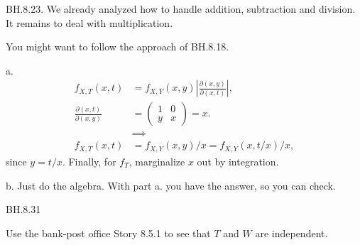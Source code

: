 \begin{exercise}
BH.8.23. We already analyzed how to handle addition, subtraction and division. It remains to deal with multiplication.
\begin{hint}
You might want to follow the approach of BH.8.18.
\end{hint}
\begin{solution}
a.
\begin{align*}
f_{X,T}(x,t) &= f_{X,Y}(x,y) |\frac{\partial (x,y)}{\partial (x, t)}|, \\
\frac{\partial (x,t)}{\partial (x,y)} &=
  \begin{pmatrix}
    1 & 0 \\
y & x
  \end{pmatrix} = x. \\
&\implies \\
f_{X,T}(x,t) &= f_{X,Y}(x,y)/x= f_{X,Y}(x,t/x)/x,
\end{align*}
since $y=t/x$. Finally, for $f_T$, marginalize $x$ out by integration.

b. Just do the algebra. With part a. you have the answer, so you can check.
\end{solution}
\end{exercise}

\begin{exercise}
BH.8.31
\begin{hint}
Use the bank-post office Story 8.5.1 to see that $T$ and $W$ are independent.
\end{hint}
\end{exercise}


